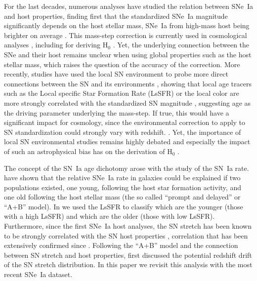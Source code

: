 \documentclass[]{aa} %
\newcommand{\nn}[1]{{\textcolor[rgb]{0.25, 0.50, 0}{#1}}}
\begin{document}
For the last decades, numerous analyses have studied the relation between SNe~Ia
and host properties, finding first that the standardized SNe~Ia magnitude
significantly depends on the host stellar mass, SNe~Ia from high-mass host being
brighter on average \cite[e.g.][]{kelly2010, sullivan2010, childress2013,
betoule2014, rigault2018, kim19}. This mass-step correction is currently used in
cosmological analyses \citep[e.g.][]{betoule2014, scolnic2018a}, including for
deriving H$_0$ \citep{riess2016, riess2019}. Yet, the underlying connection
between the SNe and their host remains unclear when using global properties such
as the host stellar mass, which raises the question of the accuracy of the
correction. More recently, studies have used the local SN environment to probe
more direct connections between the SN and its environments \citep{rigault2013},
showing that local age tracers such as the Local specific Star Formation Rate
(LsSFR) or the local color are more strongly correlated with the standardized SN
magnitude \citep{rigault2018, roman2018, kim18}, suggesting age as the driving
parameter underlying the mass-step. If true, this would have a significant
impact for cosmology, since the environmental correction to apply to SN
standardization could strongly vary with redshift. \citep{rigault2013,
childress2014, scolnic2018a}. Yet, the importance of local SN environmental
studies remains highly debated \cite[e.g.][]{jones2015, jones2019} and
especially the impact of such an astrophysical bias has on the derivation of
H$_0$ \citep{jones2015, riess2016, riess2018, rose2019}. 


The concept of the SN~Ia age dichotomy arose with the study of the SN~Ia rate.
\cite{mannucci2005, scannapieco2005, sullivan2006, aubourg2008} have shown that
the relative SNe~Ia rate in galaxies could be explained if two populations
existed, one young, following the host star formation activity, and one old
following the host stellar mass (the so called ``prompt and delayed'' or ``A+B''
model). In \cite{rigault2018} we used the LsSFR to classify which are the
younger (those with a high LsSFR) and which are the older (those with low
LsSFR). Furthermore, since the first SNe~Ia host analyses, the SN stretch has
been known to be strongly correlated with the SN host properties
\citep{hamuy1996, hamuy2000}, correlation that has been extensively confirmed
since \citep[e.g.][]{neill2009, sullivan2010, lampeitl2010, kelly2010,
gupta2011, dandrea2011, childress2013, rigault2013, pan2014, kim19}. Following
the ``A+B'' model and the connection between SN stretch and host properties,
\cite{howell2007} first discussed the potential redshift drift of the SN stretch
distribution. In this paper we revisit this analysis with the most recent SNe~Ia
dataset.
\end{document}
